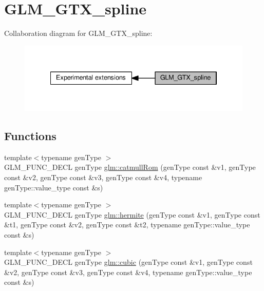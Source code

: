 \hypertarget{group__gtx__spline}{}\section{G\+L\+M\+\_\+\+G\+T\+X\+\_\+spline}
\label{group__gtx__spline}
Collaboration diagram for G\+L\+M\+\_\+\+G\+T\+X\+\_\+spline\+:
\nopagebreak
\begin{figure}[H]
\begin{center}
\leavevmode
\includegraphics[width=334pt]{d7/d53/group__gtx__spline}
\end{center}
\end{figure}
\subsection*{Functions}
\begin{DoxyCompactItemize}
\item 
{\footnotesize template$<$typename gen\+Type $>$ }\\G\+L\+M\+\_\+\+F\+U\+N\+C\+\_\+\+D\+E\+CL gen\+Type \hyperlink{group__gtx__spline_ga8119c04f8210fd0d292757565cd6918d}{glm\+::catmull\+Rom} (gen\+Type const \&v1, gen\+Type const \&v2, gen\+Type const \&v3, gen\+Type const \&v4, typename gen\+Type\+::value\+\_\+type const \&s)
\item 
{\footnotesize template$<$typename gen\+Type $>$ }\\G\+L\+M\+\_\+\+F\+U\+N\+C\+\_\+\+D\+E\+CL gen\+Type \hyperlink{group__gtx__spline_gaa69e143f6374d32f934a8edeaa50bac9}{glm\+::hermite} (gen\+Type const \&v1, gen\+Type const \&t1, gen\+Type const \&v2, gen\+Type const \&t2, typename gen\+Type\+::value\+\_\+type const \&s)
\item 
{\footnotesize template$<$typename gen\+Type $>$ }\\G\+L\+M\+\_\+\+F\+U\+N\+C\+\_\+\+D\+E\+CL gen\+Type \hyperlink{group__gtx__spline_ga6b867eb52e2fc933d2e0bf26aabc9a70}{glm\+::cubic} (gen\+Type const \&v1, gen\+Type const \&v2, gen\+Type const \&v3, gen\+Type const \&v4, typename gen\+Type\+::value\+\_\+type const \&s)
\end{DoxyCompactItemize}


